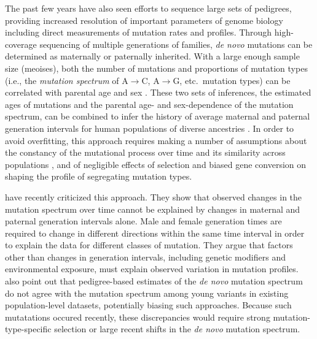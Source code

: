 \documentclass[]{article}
\begin{document}
The past few years have also seen efforts to sequence large sets of pedigrees,
providing increased resolution of important parameters of genome biology
including direct measurements of mutation rates and profiles. Through
high-coverage sequencing of multiple generations of families, \emph{de novo}
mutations can be determined as maternally or paternally inherited.
With a
large enough sample size (meoises), both the number of mutations and proportions of
mutation types (i.e., the \emph{mutation spectrum} of A$\rightarrow$C,
A$\rightarrow$G, etc.\ mutation types) can be correlated with parental age and
sex \citep{jonsson2017parental,halldorsson2019characterizing}. These two sets
of inferences, the estimated ages of mutations and the parental age- and
sex-dependence of the mutation spectrum, can be combined to infer the history
of average maternal and paternal generation intervals for human populations of
diverse ancestries \citep{macia2021different,wang2023human}. In order to avoid
overfitting, this approach requires making a number of assumptions about the
constancy of the mutational process over time and its similarity across
populations \citep{harris2015evidence,mathieson2017differences,harris2017rapid,
dewitt2021nonparametric}, and of negligible effects of selection
and biased gene conversion \citep{lachance2014biased,glemin2015quantification}
on shaping the profile of segregating mutation types.

\cite{gao2022limited} have recently criticized this approach.
They show that observed changes in the mutation spectrum over
time cannot be explained by changes in maternal and paternal generation
intervals alone. Male and female generation
times are required to change in different directions within the same time interval in
order to explain the data for different classes of mutation.
They argue that factors other than changes in generation intervals,
including genetic modifiers and environmental exposure, must explain observed
variation in mutation profiles.
\citet{gao2022limited} also point out that pedigree-based estimates of the
\emph{de novo} mutation spectrum do not agree with the mutation spectrum among
young variants in existing population-level datasets,
potentially biasing such approaches. Because such mutatations
occured recently, these discrepancies would require strong mutation-type-specific
selection or large recent shifts in the \emph{de novo} mutation spectrum.
\end{document}
